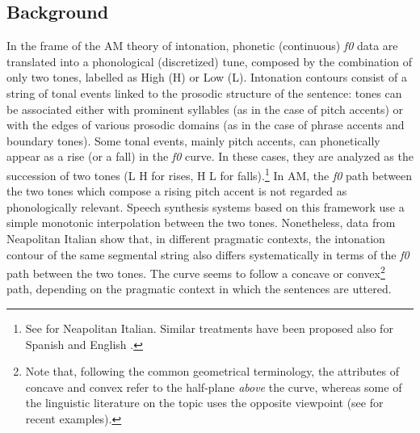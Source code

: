 \subsection{Background}\label{sec210}
In the frame of the AM theory of intonation, phonetic (continuous) \textit{f0} data are translated into a phonological (discretized) tune, composed by the combination of only two tones, labelled as High (H) or Low (L). Intonation contours consist of a string of tonal events linked to the prosodic structure of the sentence: tones can be associated either with prominent syllables (as in the case of pitch accents) or with the edges of various prosodic domains (as in the case of phrase accents and boundary tones). Some tonal events, mainly pitch accents, can phonetically appear as a rise (or a fall) in the \textit{f0} curve. In these cases, they are analyzed as the succession of two tones (L H for rises, H L for falls).\footnote{See \citet{dimperio1999tonal} for Neapolitan Italian. Similar treatments have been proposed also for Spanish \citep{hualde2002intonation,face2001focus} and English \citep{ladd2003sagging}.} In AM, the \textit{f0} path between the two tones which compose a rising pitch accent is not regarded as phonologically relevant. Speech synthesis systems based on this framework \citep{pierrehumbert1981synthesizing,anderson1984synthesis,black1996generating} use a simple monotonic interpolation between the two tones. Nonetheless, data from Neapolitan Italian \citep{dimperio2008phonetics} show that, in different pragmatic contexts, the intonation contour of the same segmental string also differs systematically in terms of the \textit{f0} path between the two tones. The curve seems to follow a concave or convex\footnote{Note that, following the common geometrical terminology, the attributes of concave and convex refer to the half-plane \textit{above} the curve, whereas some of the linguistic literature on the topic uses the opposite viewpoint (see \citealt{grice2000place,dombrowski2005acoustic} for recent examples).} path, depending on the pragmatic context in which the sentences are uttered.

